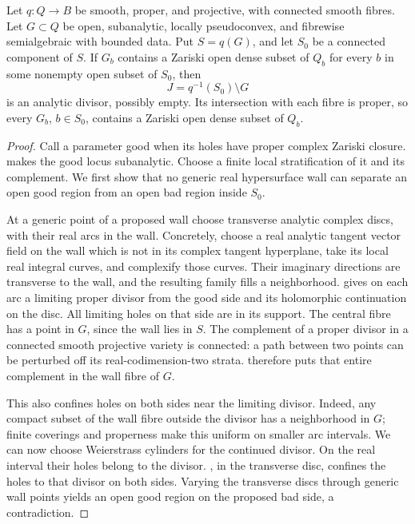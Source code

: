 \begin{proposition}
\label{prop:holes-projective-propagation}
Let $q:Q\to B$ be smooth, proper, and projective, with connected smooth fibres. Let $G\subset Q$ be open, subanalytic, locally pseudoconvex, and fibrewise semialgebraic with bounded data. Put $S=q(G)$, and let $S_0$ be a connected component of $S$. If $G_b$ contains a Zariski open dense subset of $Q_b$ for every $b$ in some nonempty open subset of $S_0$, then
\[
 J=q^{-1}(S_0)\setminus G
\]
is an analytic divisor, possibly empty. Its intersection with each fibre is proper, so every $G_b$, $b\in S_0$, contains a Zariski open dense subset of $Q_b$.
\end{proposition}

\begin{proof}
Call a parameter good when its holes have proper complex Zariski closure.  makes the good locus subanalytic. Choose a finite local stratification of it and its complement. We first show that no generic real hypersurface wall can separate an open good region from an open bad region inside $S_0$.

At a generic point of a proposed wall choose transverse analytic complex discs, with their real arcs in the wall. Concretely, choose a real analytic tangent vector field on the wall which is not in its complex tangent hyperplane, take its local real integral curves, and complexify those curves. Their imaginary directions are transverse to the wall, and the resulting family fills a neighborhood.  gives on each arc a limiting proper divisor from the good side and its holomorphic continuation on the disc. All limiting holes on that side are in its support. The central fibre has a point in $G$, since the wall lies in $S$. The complement of a proper divisor in a connected smooth projective variety is connected: a path between two points can be perturbed off its real-codimension-two strata.  therefore puts that entire complement in the wall fibre of $G$.

This also confines holes on both sides near the limiting divisor. Indeed, any compact subset of the wall fibre outside the divisor has a neighborhood in $G$; finite coverings and properness make this uniform on smaller arc intervals. We can now choose Weierstrass cylinders for the continued divisor. On the real interval their holes belong to the divisor. , in the transverse disc, confines the holes to that divisor on both sides. Varying the transverse discs through generic wall points yields an open good region on the proposed bad side, a contradiction.


\end{proof}
